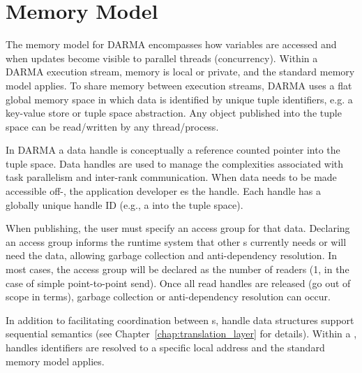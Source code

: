 
\section{Memory Model}
\label{sec:mem_model}
The memory model for \gls{DARMA} encompasses how variables are accessed %
  and when updates become visible to parallel threads (concurrency).  
Within a \gls{DARMA} execution stream, memory is local or private, and the
standard \CC{} memory model applies. 
To share memory between execution streams, \gls{DARMA} uses a flat global memory space in
which data is identified by unique \gls{tuple} identifiers, e.g. a \gls{key-value
  store} or \gls{tuple space} abstraction.  
Any object published into the \gls{tuple space} can be read/written by any thread/process. 

In \gls{DARMA} a data \gls{handle} is conceptually a \gls{reference counted pointer} into the
\gls{tuple space}.  
Data \glspl{handle} are used to manage the
complexities associated with \gls{task parallelism} and inter-\gls{rank} communication.  
When data needs to be made accessible off-, the application developer 
es the \gls{handle}.  Each \gls{handle} has a globally unique handle ID
(e.g., a  into the \gls{tuple space}).  

When publishing, the user must specify an \gls{access group} for that data.  
Declaring an \gls{access group} informs the \gls{runtime system} that other
s currently needs or will need the data,  
allowing garbage collection and \gls{anti-dependency} resolution.
In most cases, the \gls{access group} will be declared as the number of readers (1, in the case of simple point-to-point send).
Once all read \glspl{handle} are released (go out of scope in \CC{} terms),
\gls{garbage collection} or \gls{anti-dependency} resolution can occur.

In addition to facilitating coordination between s, \gls{handle} data structures 
support \gls{sequential semantics} (see Chapter~\ref{chap:translation_layer} for details).
Within a , \glspl{handle} identifiers are resolved to a
specific local address and the standard \CC{} memory model applies.


